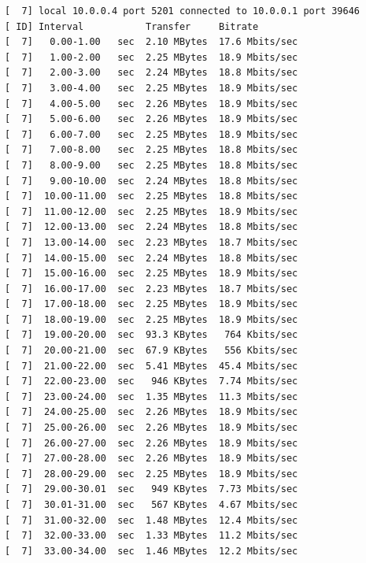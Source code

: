 \documentclass[12pt]{article}
\begin{document}
\begin{enumerate}
\begin{latin}
\begin{Verbatim}
[  7] local 10.0.0.4 port 5201 connected to 10.0.0.1 port 39646
[ ID] Interval           Transfer     Bitrate
[  7]   0.00-1.00   sec  2.10 MBytes  17.6 Mbits/sec                  
[  7]   1.00-2.00   sec  2.25 MBytes  18.9 Mbits/sec                  
[  7]   2.00-3.00   sec  2.24 MBytes  18.8 Mbits/sec                  
[  7]   3.00-4.00   sec  2.25 MBytes  18.9 Mbits/sec                  
[  7]   4.00-5.00   sec  2.26 MBytes  18.9 Mbits/sec                  
[  7]   5.00-6.00   sec  2.26 MBytes  18.9 Mbits/sec                  
[  7]   6.00-7.00   sec  2.25 MBytes  18.9 Mbits/sec                  
[  7]   7.00-8.00   sec  2.25 MBytes  18.8 Mbits/sec                  
[  7]   8.00-9.00   sec  2.25 MBytes  18.8 Mbits/sec                  
[  7]   9.00-10.00  sec  2.24 MBytes  18.8 Mbits/sec                  
[  7]  10.00-11.00  sec  2.25 MBytes  18.8 Mbits/sec                  
[  7]  11.00-12.00  sec  2.25 MBytes  18.9 Mbits/sec                  
[  7]  12.00-13.00  sec  2.24 MBytes  18.8 Mbits/sec                  
[  7]  13.00-14.00  sec  2.23 MBytes  18.7 Mbits/sec                  
[  7]  14.00-15.00  sec  2.24 MBytes  18.8 Mbits/sec                  
[  7]  15.00-16.00  sec  2.25 MBytes  18.9 Mbits/sec                  
[  7]  16.00-17.00  sec  2.23 MBytes  18.7 Mbits/sec                  
[  7]  17.00-18.00  sec  2.25 MBytes  18.9 Mbits/sec                  
[  7]  18.00-19.00  sec  2.25 MBytes  18.9 Mbits/sec                  
[  7]  19.00-20.00  sec  93.3 KBytes   764 Kbits/sec                  
[  7]  20.00-21.00  sec  67.9 KBytes   556 Kbits/sec                  
[  7]  21.00-22.00  sec  5.41 MBytes  45.4 Mbits/sec                  
[  7]  22.00-23.00  sec   946 KBytes  7.74 Mbits/sec                  
[  7]  23.00-24.00  sec  1.35 MBytes  11.3 Mbits/sec                  
[  7]  24.00-25.00  sec  2.26 MBytes  18.9 Mbits/sec                  
[  7]  25.00-26.00  sec  2.26 MBytes  18.9 Mbits/sec                  
[  7]  26.00-27.00  sec  2.26 MBytes  18.9 Mbits/sec                  
[  7]  27.00-28.00  sec  2.26 MBytes  18.9 Mbits/sec                  
[  7]  28.00-29.00  sec  2.25 MBytes  18.9 Mbits/sec                  
[  7]  29.00-30.01  sec   949 KBytes  7.73 Mbits/sec                  
[  7]  30.01-31.00  sec   567 KBytes  4.67 Mbits/sec                  
[  7]  31.00-32.00  sec  1.48 MBytes  12.4 Mbits/sec                  
[  7]  32.00-33.00  sec  1.33 MBytes  11.2 Mbits/sec                  
[  7]  33.00-34.00  sec  1.46 MBytes  12.2 Mbits/sec                  

\end{Verbatim}
\end{latin}
\end{enumerate}
\end{document}
